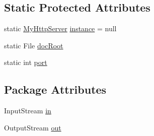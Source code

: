 \subsection*{\-Static \-Protected \-Attributes}
\begin{DoxyCompactItemize}
\item 
static \hyperlink{classcom_1_1axcoto_1_1shinjuku_1_1maki_1_1_my_http_server}{\-My\-Http\-Server} \hyperlink{classcom_1_1axcoto_1_1shinjuku_1_1maki_1_1_my_http_server_a7f213870a9b83c7578630564fa753d95}{instance} = null
\item 
static \-File \hyperlink{classcom_1_1axcoto_1_1shinjuku_1_1maki_1_1_my_http_server_a7b52e0245ff0ba71b7b288bc51f1e18a}{doc\-Root}
\item 
static int \hyperlink{classcom_1_1axcoto_1_1shinjuku_1_1maki_1_1_my_http_server_a63c89c04d1feae07ca35558055155ffb}{port}
\end{DoxyCompactItemize}
\subsection*{\-Package \-Attributes}
\begin{DoxyCompactItemize}
\item 
\-Input\-Stream \hyperlink{classcom_1_1axcoto_1_1shinjuku_1_1maki_1_1_my_http_server_adb3e897bb2a9250b5cc4e9a956ab1fd4}{in}
\item 
\-Output\-Stream \hyperlink{classcom_1_1axcoto_1_1shinjuku_1_1maki_1_1_my_http_server_a657d822efeac27f72fd062b9a5a4ceab}{out}
\end{DoxyCompactItemize}


